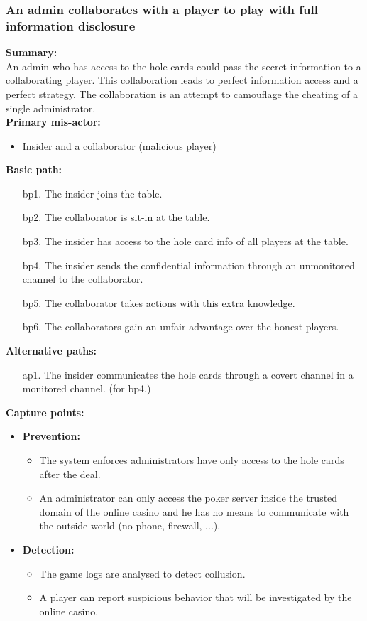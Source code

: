 \documentclass[a4paper,11pt]{report}
\begin{document}
\subsubsection{An admin collaborates with a player to play with full information disclosure}
\textbf{Summary:} \\
An admin who has access to the hole cards could pass the secret information to a collaborating player. This collaboration leads to perfect information access and a perfect strategy. The collaboration is an attempt to camouflage the cheating of a single administrator. \\
\textbf{Primary mis-actor:}
\begin{itemize}
\item Insider and a collaborator (malicious player)
\end{itemize}
\textbf{Basic path:}
\begin{enumerate}
\item[bp1.] The insider joins the table. 
\item[bp2.] The collaborator is sit-in at the table. 
\item[bp3.] The insider has access to the hole card info of all players at the table. 
\item[bp4.] The insider sends the confidential information through an unmonitored channel to the collaborator. 
\item[bp5.] The collaborator takes actions with this extra knowledge. 
\item[bp6.] The collaborators gain an unfair advantage over the honest players.
\end{enumerate}
\textbf{Alternative paths:}
\begin{itemize}
\item[ap1.] The insider communicates the hole cards through a covert channel in a monitored channel. (for bp4.)
\end{itemize}
\textbf{Capture points:}
\begin{itemize}
\item \textbf{Prevention:}
\begin{itemize}
\item The system enforces administrators have only access to the hole cards after the deal.
\item An administrator can only access the poker server inside the trusted domain of the online casino and he has no means to communicate with the outside world (no phone, firewall, ...).
\end{itemize}
\item \textbf{Detection:}
\begin{itemize}
\item The game logs are analysed to detect collusion.
\item A player can report suspicious behavior that will be investigated by the online casino.
\end{itemize}
\end{itemize}
\end{document}
